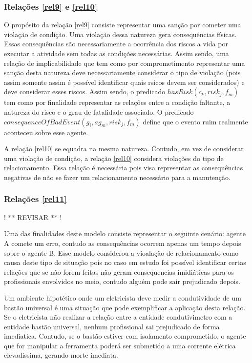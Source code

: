 \documentclass[12pt]{article}
\begin{document}
\subsubsection{Relações \ref{rel9} e \ref{rel10}}

O propósito da relação \ref{rel9} consiste representar uma sanção por cometer uma violação de condição. Uma violação dessa natureza gera consequências físicas. Essas consequências são necessariamente a ocorrência dos riscos a vida por executar a atividade sem todas as condições necessárias. Assim sendo, uma relação de implicabilidade que tem como por comprometimento representar uma sanção desta natureza deve necessariamente considerar o tipo de violação (pois assim somente assim é possível identificar quais rsicos devem ser considerados) e deve considerar esses riscos. Assim sendo, o predicado $hasRisk(c_k,risk_j,f_m)$ tem como por finalidade representar as relações entre a condição faltante, a natureza do risco e o grau de fatalidade associado. O predicado $consequenceOfBadEvent(g_i,ag_m,risk_j,f_m)$ define que o evento ruim realmente aconteceu sobre esse agente. 


A relação \ref{rel10} se equadra na mesma natureza. Contudo, em vez de considerar uma violação de condição, a relação \ref{rel10} considera violações do tipo de relacionamento. Essa relação é necessária pois visa representar as consequências negativas de não se fazer um relacionamento necessário para a manutenção. 


\subsubsection{Relações \ref{rel11}}

! ** REVISAR  ** !

Uma das finalidades deste modelo consiste representar o seguinte cenário: agente A comete um erro, contudo as consequências ocorrem apenas um tempo depois sobre o agente B. Esse modelo considerou a vioalação de relacionamento como causa deste tipo de situação pois no caso em estudo foi possível identificar certas relações que se não forem feitas não geram consequencias imidiáticas para os profissionais envolvidos no meio, contudo alguém pode sair prejudicado depois. 

Um ambiente hipotético onde um eletricista deve medir a condutividade de um bastão universal é uma situação que pode exemplificar a aplicação desta relação. Se o eletricista não realizar a relação entre a entidade condutivimetro com a entidade bastão universal, nenhum profissional sai prejudicado de forma imediatica. Contudo, se o bastão estiver com isolamento comprometido, o agente que for manipular a ferramenta poderá ser submetido a uma corrente elétrica elevadissima, gerando morte imediata.
\end{document}
